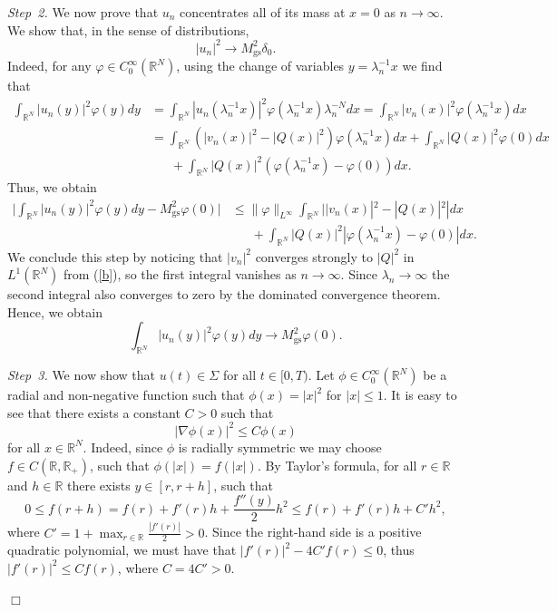 \documentclass[reqno]{amsart}
\newcommand{\real}{\mathbb{R}}
\newcommand{\rn}{\real^N}
\let\le=\leqslant
\theoremstyle{plain}
\theoremstyle{definition}
\numberwithin{equation}{section}
\newenvironment{proofof}
{\medskip\noindent{\it Proof of}}{\nolinebreak\hfill$\Box$\medskip}
\begin{document}
\begin{proofof}
\medskip
\noindent
{\em Step~2.} 
We now prove that $u_n$ concentrates all of its mass at $x=0$ as $n\rightarrow\infty$. 
We show that, in the sense of distributions,
\[
|u_n|^2\rightarrow M_\mathrm{gs}^2\delta_0.
\]
Indeed, for any $\varphi\in C^\infty_0(\rn)$, using the change of variables $y=\lambda_n^{-1}x$
we find that
\[
\begin{split}
\int_{\rn}|u_n(y)|^2\varphi(y)dy
&=\int_{\rn}|u_n(\lambda_n^{-1}x)|^2\varphi(\lambda^{-1}_nx)\lambda_n^{-N}dx
=\int_{\rn}|v_n(x)|^2\varphi(\lambda_n^{-1}x)dx\\
&=\int_{\rn}(|v_n(x)|^2-|Q(x)|^2)\varphi(\lambda_n^{-1}x)dx+\int_{\rn} |Q(x)|^2\varphi(0)dx\\
&\phantom{\le} \ +\int_{\rn}|Q(x)|^2(\varphi(\lambda_n^{-1}x)-\varphi(0))dx.
\end{split}
\]
Thus, we obtain
\[
\begin{split}
\Big|\int_{\rn}|u_n(y)|^2\varphi(y)dy -M_\mathrm{gs}^2\varphi(0)\Big|
&\le \|\varphi\|_{L^\infty}\int_{\rn}||v_n(x)|^2-|Q(x)|^2|dx\\
&\phantom{\le} \ +\int_{\rn}|Q(x)|^2|\varphi(\lambda_n^{-1}x)-\varphi(0)|dx.
\end{split}
\]
We conclude this step by noticing that $|v_n|^2$ converges strongly to 
$|Q|^2$ in $L^1(\rn)$ from (\ref{b}), so the first integral vanishes as $n\rightarrow\infty$. 
Since $\lambda_n\rightarrow\infty$ the second integral also converges to zero 
by the dominated convergence theorem. Hence, we obtain
\begin{equation} \label{c}
\int_{\rn}|u_n(y)|^2\varphi(y)dy\rightarrow M_\mathrm{gs}^2\varphi(0).
\end{equation}

\medskip
\noindent
{\em Step~3.} 
We now show that $u(t)\in\Sigma$ for all $t\in[0,T)$. 
Let $\phi\in C^\infty_0(\rn)$ be a radial and non-negative function such that 
$\phi(x)=|x|^2$ for $|x|\le 1$. It is easy to see that there exists a constant $C>0$ such that
\[
|\nabla \phi (x) |^2\le C\phi(x)
\]
for all $x\in\rn$.
Indeed, since $\phi$ is radially symmetric we may choose $f\in C(\real,\real_+) $, such that $\phi(|x|)=f(|x|)$. By Taylor's formula, for all $r\in\real$ and $h\in\real$ there exists $y\in[r,r+h]$, such that
\[
 0\le f(r+h)=f(r)+f'(r)h+\frac{f''(y)}{2}h^2\le f(r)+f'(r)h+C'h^2,
\]
where $C'=1+\max_{r\in\real}\frac{|f'(r)|}{2}>0$. Since the right-hand side is a positive    
quadratic polynomial, we must have that $|f'(r)|^2-4C'f(r)\le 0$, thus $|f'(r)|^2\le Cf(r)$, where $C=4C'>0$.


\end{proofof}
\end{document}
